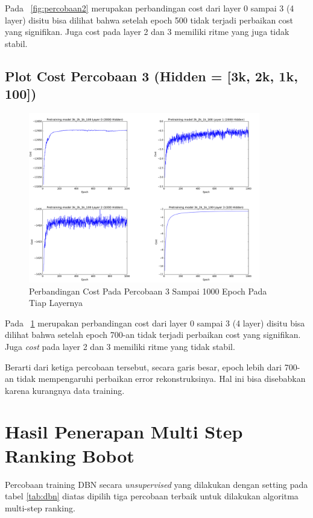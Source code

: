 Pada \pic~\ref{fig:percobaan2} merupakan perbandingan cost dari layer 0 sampai 3 (4 layer) disitu bisa dilihat bahwa setelah epoch 500 tidak terjadi perbaikan cost yang signifikan. Juga cost pada layer 2 dan 3 memiliki ritme yang juga tidak stabil.

\subsection{Plot Cost Percobaan 3 (Hidden = [3k, 2k, 1k, 100])}
\begin{figure}
	\centering
	\includegraphics[width=0.9\textwidth]
		{pics/percobaan_3.png}
	\caption{Perbandingan Cost Pada Percobaan 3 Sampai 1000 Epoch Pada Tiap Layernya}
	\label{fig:percobaan3}
\end{figure}
Pada \pic~\ref{fig:percobaan3} merupakan perbandingan cost dari layer 0 sampai 3 (4 layer) disitu bisa dilihat bahwa setelah epoch 700-an tidak terjadi perbaikan cost yang signifikan. Juga \textit{cost} pada layer 2 dan 3 memiliki ritme yang tidak stabil.

Berarti dari ketiga percobaan tersebut, secara garis besar, epoch lebih dari 700-an tidak mempengaruhi perbaikan error rekonstruksinya. Hal ini bisa disebabkan karena kurangnya data training.


\section{Hasil Penerapan Multi Step Ranking Bobot}

Percobaan training DBN secara \textit{unsupervised} yang dilakukan dengan setting pada tabel \ref{tab:dbn} diatas dipilih tiga percobaan terbaik untuk dilakukan algoritma multi-step ranking.

